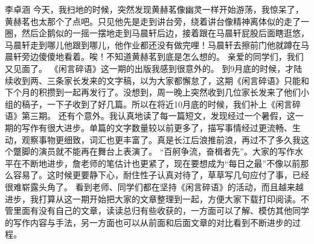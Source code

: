 {}\markdownRendererInterblockSeparator
{}李卓涵\markdownRendererInterblockSeparator
{}今天，我扫地的时候，突然发现黄赫茗像幽灵一样开始游荡，我惊呆了，黄赫茗也太那个了点吧。只见他先是走到讲台旁，绕着讲台像精神离体似的走了一圈，然后企鹅似的一摇一摆地走到马晨轩后边，接着跟在马晨轩屁股后面瞎逛悠，马晨轩走到哪儿他跟到哪儿，他作业都还没有做完哩！马晨轩去擦前门他就蹲在马晨轩旁边傻傻地看着。唉！不知道黄赫茗到底是怎么想的。\markdownRendererInterblockSeparator
{}\markdownRendererInterblockSeparator
{}亲爱的同学们，我们又见面了。\markdownRendererInterblockSeparator
{}《闲言碎语》这一期的出版我感到很意外的。\markdownRendererInterblockSeparator
{}到9月底的时候，才陆续收到两、三条家长发来的文字稿，以为大家都懈怠了，这期《闲言碎语》只能和下个月的积攒到一起再发行了。没想到，周一晚上突然收到几位家长发来了他们小组的稿子，一下子收到了好几篇。所以在将近10月底的时候，我们补上《闲言碎语》第三期。\markdownRendererInterblockSeparator
{}还有个意外。我认真地读了每一篇短文，发现经过一个暑假，这一期的写作有很大进步。单篇的文字数量较以前更多了，描写事情经过更流畅、生动，观察事物更细致，词汇也更丰富了。真是长江后浪推前浪，再过不了多久我这个蹩脚的演员就不能再在舞台上表演了。\markdownRendererInterblockSeparator
{}“百舸争流，奋楫者先”。大家的写作水平在不断地进步，詹老师的笔估计也更紧了，现在要想成为“每日之最”不像以前那么容易了。这时候更要静下心，耐住性子认真对待了，草草写几句应付了事，已经很难崭露头角了。\markdownRendererInterblockSeparator
{}看到老师、同学们都在坚持《闲言碎语》的活动，而且越来越进步，我打算从这一期开始把大家的文章整理到一起，方便大家下载打印阅读。不管里面有没有自己的文章，读读总归有些收获的，一方面可以了解、模仿其他同学的写作内容与手法，另一方面也可以从前面和后面文章的对比看到不断进步的过程。\relax